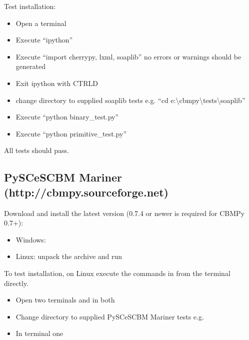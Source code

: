\documentclass[letterpaper,10pt,english]{sphinxmanual}
\begin{document}
\sphinxAtStartPar
Test installation:
\begin{itemize}
\item {} 
\sphinxAtStartPar
Open a terminal

\item {} 
\sphinxAtStartPar
Execute “ipython”

\item {} 
\sphinxAtStartPar
Execute “import cherrypy, lxml, soaplib” no errors or warnings should be generated

\item {} 
\sphinxAtStartPar
Exit ipython with CTRL\sphinxhyphen{}D

\item {} 
\sphinxAtStartPar
change directory to supplied soaplib tests e.g. “cd e:\textbackslash{}cbmpy\textbackslash{}tests\textbackslash{}soaplib”

\item {} 
\sphinxAtStartPar
Execute “python binary\_test.py”

\item {} 
\sphinxAtStartPar
Execute “python primitive\_test.py”

\end{itemize}

\sphinxAtStartPar
All tests should pass.


\subsection{PySCeS\sphinxhyphen{}CBM Mariner (http://cbmpy.sourceforge.net)}
\label{\detokenize{install_doc:pysces-cbm-mariner-http-cbmpy-sourceforge-net}}
\sphinxAtStartPar
Download and install the latest version (0.7.4 or newer is required for CBMPy 0.7+):
\begin{itemize}
\item {} 
\sphinxAtStartPar
Windows: 

\item {} 
\sphinxAtStartPar
Linux: unpack the archive and run 

\end{itemize}

\sphinxAtStartPar
To test installation, on Linux execute the commands in  from the terminal directly.
\begin{itemize}
\item {} 
\sphinxAtStartPar
Open two terminals and in both

\item {} 
\sphinxAtStartPar
Change directory to supplied PySCeS\sphinxhyphen{}CBM Mariner tests e.g. 

\item {} 
\sphinxAtStartPar
In terminal one 

\end{itemize}
\end{document}
